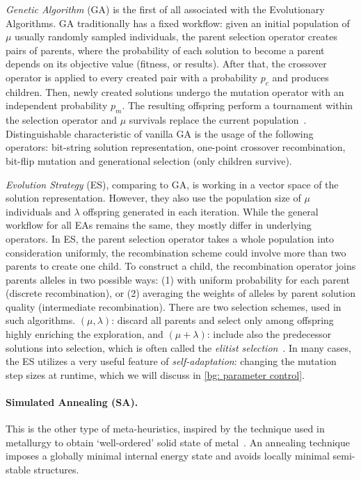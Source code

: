 \emph{Genetic Algorithm} (GA) is the first of all associated with the Evolutionary Algorithms. GA traditionally has a fixed workflow: given an initial population of $\mu$ usually randomly sampled individuals, the parent selection operator creates pairs of parents, where the probability of each solution to become a parent depends on its objective value (fitness, or results). After that, the crossover operator is applied to every created pair with a probability $p_c$ and produces children. Then, newly created solutions undergo the mutation operator with an independent probability $p_m$. The resulting offspring perform a tournament within the selection operator and $\mu$ survivals replace the current population~\cite{eiben2015popular}. Distinguishable characteristic of vanilla GA is the usage of the following operators: bit-string solution representation, one-point crossover recombination, bit-flip mutation and generational selection (only children survive).

\emph{Evolution Strategy} (ES), comparing to GA, is working in a vector space of the solution representation. However, they also use the population size of $\mu$ individuals and $\lambda$ offspring generated in each iteration. While the general workflow for all EAs remains the same, they mostly differ in underlying operators. In ES, the parent selection operator takes a whole population into consideration uniformly, the recombination scheme could involve more than two parents to create one child. To construct a child, the recombination operator joins parents alleles in two possible ways: (1) with uniform probability for each parent (discrete recombination), or (2) averaging the weights of alleles by parent solution quality (intermediate recombination). There are two selection schemes, used in such algorithms. $(\mu,\lambda)$: discard all parents and select only among offspring highly enriching the exploration, and $(\mu+\lambda)$: include also the predecessor solutions into selection, which is often called the \textit{elitist selection}~\cite{eiben2015popular}. In many cases, the ES utilizes a very useful feature of \emph{self-adaptation}: changing the mutation step sizes at runtime, which we will discuss in \cref{bg: parameter control}.

\paragraph{Simulated Annealing (SA).} This is the other type of meta-heuristics, inspired by the technique used in metallurgy to obtain `well-ordered' solid state of metal~\cite{van1987simulated}. An annealing technique imposes a globally minimal internal energy state and avoids locally minimal semi-stable structures. 

